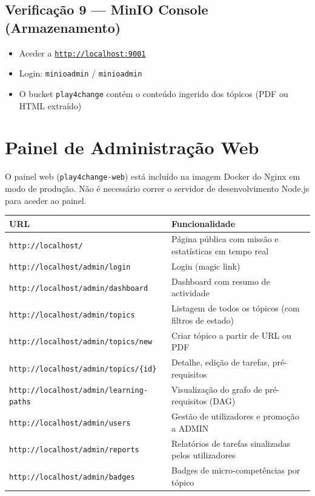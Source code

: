 \documentclass[12pt,a4paper]{article}
\begin{document}
\subsection{Verificação 9 — MinIO Console (Armazenamento)}

\begin{itemize}
  \item Aceder a \href{http://localhost:9001}{\texttt{http://localhost:9001}}
  \item Login: \texttt{minioadmin} / \texttt{minioadmin}
  \item O bucket \texttt{play4change} contém o conteúdo ingerido dos tópicos (PDF ou HTML extraído)
\end{itemize}

\section{Painel de Administração Web}

O painel web (\texttt{play4change-web}) está incluído na imagem Docker do Nginx em modo de produção. Não é necessário correr o servidor de desenvolvimento Node.js para aceder ao painel.

\begin{center}
\begin{tabularx}{\textwidth}{lX}
\toprule
\textbf{URL} & \textbf{Funcionalidade} \\
\midrule
\texttt{http://localhost/} & Página pública com missão e estatísticas em tempo real \\
\texttt{http://localhost/admin/login} & Login (magic link) \\
\texttt{http://localhost/admin/dashboard} & Dashboard com resumo de actividade \\
\texttt{http://localhost/admin/topics} & Listagem de todos os tópicos (com filtros de estado) \\
\texttt{http://localhost/admin/topics/new} & Criar tópico a partir de URL ou PDF \\
\texttt{http://localhost/admin/topics/\{id\}} & Detalhe, edição de tarefas, pré-requisitos \\
\texttt{http://localhost/admin/learning-paths} & Visualização do grafo de pré-requisitos (DAG) \\
\texttt{http://localhost/admin/users} & Gestão de utilizadores e promoção a ADMIN \\
\texttt{http://localhost/admin/reports} & Relatórios de tarefas sinalizadas pelos utilizadores \\
\texttt{http://localhost/admin/badges} & Badges de micro-competências por tópico \\
\bottomrule
\end{tabularx}
\end{center}
\end{document}
